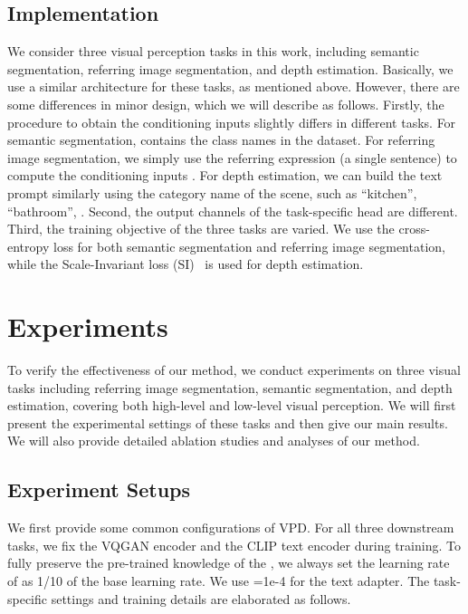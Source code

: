 \documentclass[10pt,twocolumn,letterpaper]{article}
\newcommand{\epstheta}{}
\begin{document}
\subsection{Implementation}
We consider three visual perception tasks in this work, including semantic segmentation, referring image segmentation, and depth estimation. Basically, we use a similar architecture for these tasks, as mentioned above. However, there are some differences in minor design, which we will describe as follows. Firstly, the procedure to obtain the conditioning inputs  slightly differs in different tasks. For semantic segmentation,  contains the class names in the dataset. For referring image segmentation, we simply use the referring expression (a single sentence) to compute the conditioning inputs . For depth estimation, we can build the text prompt similarly using the category name of the scene, such as ``kitchen'', ``bathroom'', \etc. Second, the output channels of the task-specific head  are different. Third, the training objective of the three tasks are varied. We use the cross-entropy loss for both semantic segmentation and referring image segmentation, while the Scale-Invariant loss (SI)~\cite{eigen2014silog} is used for depth estimation. 

\section{Experiments}
To verify the effectiveness of our method, we conduct experiments on three visual tasks including  referring image segmentation, semantic segmentation, and depth estimation, covering both high-level and low-level visual perception. We will first present the experimental settings of these tasks and then give our main results. We will also provide detailed ablation studies and analyses of our method.

\subsection{Experiment Setups}
We first provide some common configurations of VPD. For all three downstream tasks, we fix the VQGAN encoder  and the CLIP text encoder during training. To fully preserve the pre-trained knowledge of the \epstheta{}, we always set the learning rate of \epstheta{} as 1/10 of the base learning rate. We use =1e-4 for the text adapter. The task-specific settings and training details are elaborated as follows.

\label{sec:exp_setup}
\end{document}
